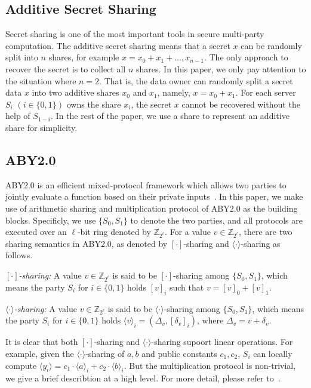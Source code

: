 \documentclass[conference]{IEEEtran}
\begin{document}
\subsection{Additive Secret Sharing}
Secret sharing is one of the most important tools in secure multi-party computation.
The additive secret sharing means that a secret $x$ can be randomly split into $n$ shares, for example $x = x_0 + x_1 + \ldots, x_{n-1}$.
The only approach to recover the secret is to collect all $n$ shares.
In this paper, we only pay attention to the situation where $n=2$.
That is, the data owner can randomly split a secret data $x$ into two additive shares $x_0$ and $x_1$, namely, $x = x_0 + x_1$.
For each server $S_i$ $(i\in\{0,1\})$ owns the share $x_i$, the secret $x$ cannot be recovered without the help of $S_{1-i}$.
In the rest of the paper, we use a share to represent an additive share for simplicity.

\iffalse
\subsection{ABY2.0}
ABY2.0 is an efficient mixed-protocol framework which allows two parties to jointly evaluate a function based on their private inputs~\cite{patra_aby20_2020}.
In this paper, we make use of arithmetic sharing and multiplication protocol of ABY2.0 as the building blocks.
Specificly, we use $\{S_0, S_1\}$ to denote the two parties, and all protocols are executed over an $\ell$-bit ring denoted by $\mathbb{Z}_{2^\ell}$.
For a value $v\in\mathbb{Z}_{2^\ell}$, there are two sharing semantics in ABY2.0, as denoted by $[\cdot]$-sharing and $\langle \cdot \rangle$-sharing as follows.

\textit{$[\cdot]$-sharing:} A value $v\in\mathbb{Z}_{2^\ell}$ is said to be $[\cdot]$-sharing among $\{S_0, S_1\}$, which means the party $S_i$ for $i\in\{0,1\}$ holds $[v]_i$ such that $v = [v]_0 + [v]_1$.

\textit{$\langle \cdot \rangle$-sharing:} A value $v\in\mathbb{Z}_{2^\ell}$ is said to be $\langle \cdot \rangle$-sharing among $\{S_0, S_1\}$, which means the party $S_i$ for $i\in\{0,1\}$ holds $\langle v \rangle_i = (\Delta_v, [\delta_v]_i)$, where $\Delta_v = v + \delta_v$.

It is clear that both $[\cdot]$-sharing and $\langle \cdot \rangle$-sharing supoort linear operations.
For example, given the $\langle \cdot \rangle$-sharing of $a,b$ and public constants $c_1,c_2$, $S_i$ can locally compute $\langle y_i \rangle = c_1 \cdot \langle a \rangle_i + c_2 \cdot \langle b \rangle_i$.
But the multiplication protocol is non-trivial, we give a brief describtion at a high level.
For more detail, please refer to~\cite{patra_aby20_2020}.
\end{document}
